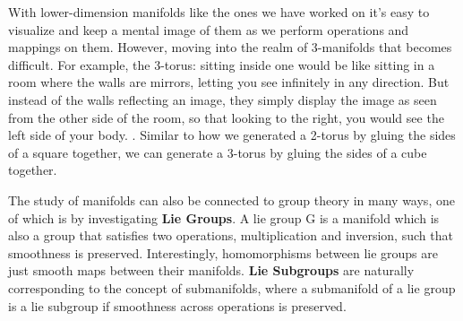 \documentclass[letterpaper,12pt]{article}
\begin{document}
With lower-dimension manifolds like the ones we have worked on it's easy to visualize and keep a mental image of them as we perform operations and mappings on them. However, moving into the realm of 3-manifolds that becomes difficult. For example, the 3-torus: sitting inside one would be like sitting in a room where the walls are mirrors, letting you see infinitely in any direction. But instead of the walls reflecting an image, they simply display the image as seen from the other side of the room, so that looking to the right, you would see the left side of your body. \cite[p.31]{Thurston}. Similar to how we generated a 2-torus by gluing the sides of a square together, we can generate a 3-torus by gluing the sides of a cube together.

The study of manifolds can also be connected to group theory in many ways, one of which is by investigating \textbf{Lie Groups}. A lie group G is a manifold which is also a group that satisfies two operations, multiplication and inversion, such that smoothness is preserved. \cite[p.164]{Tu} Interestingly, homomorphisms between lie groups are just smooth maps between their manifolds. \textbf{Lie Subgroups} are naturally  corresponding to the concept of submanifolds, where a submanifold of a lie group is a lie subgroup if smoothness across operations is preserved. 



\end{document}
